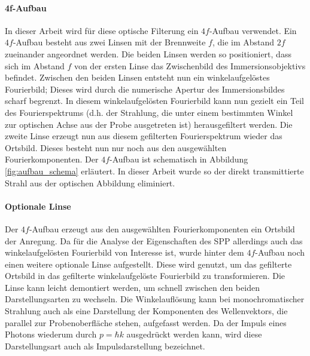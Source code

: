 \documentclass[titlepage,  ngerman]{article}
\begin{document}
	\paragraph{4f-Aufbau}
	In dieser Arbeit wird für diese optische Filterung ein $4f$-Aufbau verwendet. Ein $4f$-Aufbau besteht aus zwei Linsen mit der Brennweite $f$, die im Abstand $2f$ zueinander angeordnet werden. Die beiden Linsen werden so positioniert, dass sich im Abstand $f$ von der ersten Linse das Zwischenbild des Immersionsobjektivs befindet. Zwischen den beiden Linsen entsteht nun ein winkelaufgelöstes Fourierbild; Dieses wird durch die numerische Apertur des Immersionsbildes scharf begrenzt.  In diesem winkelaufgelösten Fourierbild kann nun gezielt ein Teil des Fourierspektrums (d.h. der Strahlung, die unter einem bestimmten Winkel zur optischen Achse aus der Probe ausgetreten ist) herausgefiltert werden. Die zweite Linse erzeugt nun aus diesem gefilterten Fourierspektrum wieder das Ortsbild. Dieses besteht nun nur noch aus den ausgewählten Fourierkomponenten. Der $4f$-Aufbau ist schematisch in Abbildung \ref{fig:aufbau_schema} erläutert. In dieser Arbeit wurde so der direkt transmittierte Strahl aus der optischen Abbildung eliminiert.
	\paragraph{Optionale Linse}
	Der $4f$-Aufbau erzeugt aus den ausgewählten Fourierkomponenten ein Ortsbild der Anregung. Da für die Analyse der Eigenschaften des SPP allerdings auch das winkelaufgelösten Fourierbild von Interesse ist, wurde hinter dem $4f$-Aufbau noch einen weitere optionale Linse aufgestellt. Diese wird genutzt, um das gefilterte Ortsbild in das gefilterte winkelaufgelöste Fourierbild zu transformieren. Die Linse kann leicht demontiert werden, um schnell zwischen den beiden Darstellungsarten zu wechseln. Die Winkelauflösung kann bei monochromatischer Strahlung auch als eine Darstellung der Komponenten des Wellenvektors, die parallel zur Probenoberfläche stehen, aufgefasst werden. Da der Impuls eines Photons wiederum durch $p = \hbar k$ ausgedrückt werden kann, wird diese Darstellungsart auch als Impulsdarstellung bezeichnet.
	
\end{document}
